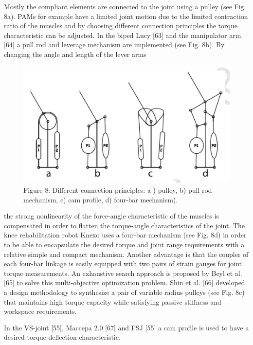 \documentclass[10pt]{article}
\begin{document}
Mostly the compliant elements are connected to the joint using a pulley (see Fig. 8a). PAMs for example have a limited joint motion due to the limited contraction ratio of the muscles and by choosing different connection principles the torque characteristic can be adjusted. In the biped Lucy [63] and the manipulator arm [64] a pull rod and leverage mechanism are implemented (see Fig. 8b). By changing the angle and length of the lever arms

\begin{figure}[h]
\begin{center}
  \includegraphics[width=\textwidth]{2025_09_17_f0417c8723605e4ad1efg-17}
\captionsetup{labelformat=empty}
\caption{Figure 8: Different connection principles: a ) pulley, b) pull rod mechanism, c) cam profile, d) four-bar mechanism).}
\end{center}
\end{figure}

the strong nonlinearity of the force-angle characteristic of the muscles is compensated in order to flatten the torque-angle characteristics of the joint. The knee rehabilitation robot Knexo uses a four-bar mechanism (see Fig. 8d) in order to be able to encapsulate the desired torque and joint range requirements with a relative simple and compact mechanism. Another advantage is that the coupler of each four-bar linkage is easily equipped with two pairs of strain gauges for joint torque measurements. An exhaustive search approach is proposed by Beyl et al. [65] to solve this multi-objective optimization problem. Shin et al. [66] developed a design methodology to synthesize a pair of variable radius pulleys (see Fig. 8c) that maintains high torque capacity while satisfying passive stiffness and workspace requirements.

In the VS-joint [55], Maccepa 2.0 [67] and FSJ [55] a cam profile is used to have a desired torque-deflection characteristic.
\end{document}
